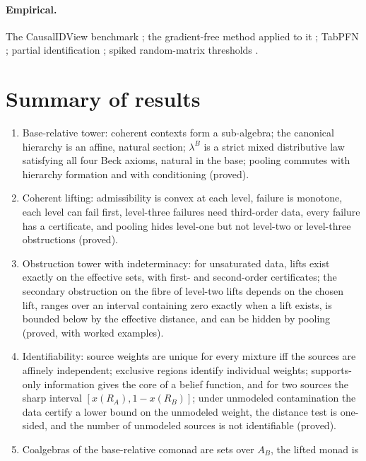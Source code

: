 \documentclass[11pt]{article}
\theoremstyle{definition}
\theoremstyle{remark}
\begin{document}
\paragraph{Empirical.} The CausalIDView benchmark \cite{Jung2026}; the gradient-free method applied
to it \cite[Section~51]{Awasthi-ThreeLayers}; TabPFN \cite{Hollmann2023}; partial
identification \cite{Manski1990}; spiked random-matrix thresholds \cite{BBP2005}.

\section{Summary of results}

\begin{enumerate}[leftmargin=*]
\item Base-relative tower: coherent contexts form a sub-algebra; the canonical hierarchy is an
  affine, natural section; $\lambda^B$ is a strict mixed distributive law satisfying all four Beck
  axioms, natural in the base; pooling commutes with hierarchy formation and with conditioning
  (proved).
\item Coherent lifting: admissibility is convex at each level, failure is monotone, each level can
  fail first, level-three failures need third-order data, every failure has a certificate, and pooling
  hides level-one but not level-two or level-three obstructions (proved).
\item Obstruction tower with indeterminacy: for unsaturated data, lifts exist exactly on the effective
  sets, with first- and second-order certificates; the secondary obstruction on the fibre of level-two
  lifts depends on the chosen lift, ranges over an interval containing zero exactly when a lift exists,
  is bounded below by the effective distance, and can be hidden by pooling (proved, with worked
  examples).
\item Identifiability: source weights are unique for every mixture iff the sources are affinely
  independent; exclusive regions identify individual weights; supports-only information gives the
  core of a belief function, and for two sources the sharp interval $[x(R_A),1-x(R_B)]$; under
  unmodeled contamination the data certify a lower bound on the unmodeled weight, the distance test
  is one-sided, and the number of unmodeled sources is not identifiable (proved).
\item Coalgebras of the base-relative comonad are sets over $A_B$, the lifted monad is

\end{enumerate}
\end{document}

